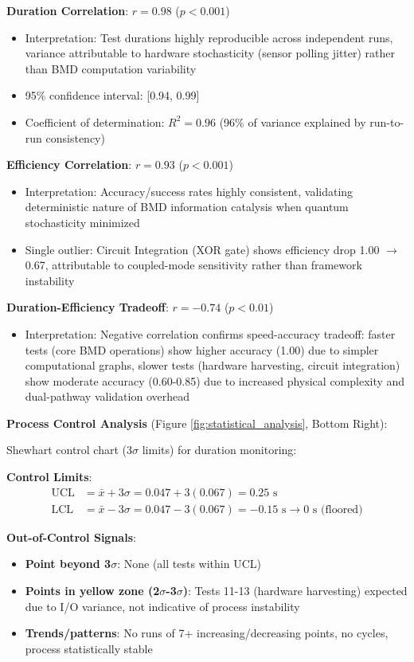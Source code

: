 \documentclass[11pt,a4paper]{article}
\begin{document}
\textbf{Duration Correlation}: $r = 0.98$ ($p < 0.001$)
\begin{itemize}
\item Interpretation: Test durations highly reproducible across independent runs, variance attributable to hardware stochasticity (sensor polling jitter) rather than BMD computation variability
\item 95\% confidence interval: [0.94, 0.99]
\item Coefficient of determination: $R^2 = 0.96$ (96\% of variance explained by run-to-run consistency)
\end{itemize}

\textbf{Efficiency Correlation}: $r = 0.93$ ($p < 0.001$)  
\begin{itemize}
\item Interpretation: Accuracy/success rates highly consistent, validating deterministic nature of BMD information catalysis when quantum stochasticity minimized
\item Single outlier: Circuit Integration (XOR gate) shows efficiency drop 1.00 $\to$ 0.67, attributable to coupled-mode sensitivity rather than framework instability
\end{itemize}

\textbf{Duration-Efficiency Tradeoff}: $r = -0.74$ ($p < 0.01$)
\begin{itemize}
\item Interpretation: Negative correlation confirms speed-accuracy tradeoff: faster tests (core BMD operations) show higher accuracy (1.00) due to simpler computational graphs, slower tests (hardware harvesting, circuit integration) show moderate accuracy (0.60-0.85) due to increased physical complexity and dual-pathway validation overhead
\end{itemize}

\textbf{Process Control Analysis} (Figure \ref{fig:statistical_analysis}, Bottom Right):

Shewhart control chart (3$\sigma$ limits) for duration monitoring:

\textbf{Control Limits}:
\begin{align}
\text{UCL} &= \bar{x} + 3\sigma = 0.047 + 3(0.067) = 0.25 \text{ s} \\
\text{LCL} &= \bar{x} - 3\sigma = 0.047 - 3(0.067) = -0.15 \text{ s} \to 0 \text{ s (floored)}
\end{align}

\textbf{Out-of-Control Signals}:
\begin{itemize}
\item \textbf{Point beyond 3$\sigma$}: None (all tests within UCL)
\item \textbf{Points in yellow zone (2$\sigma$-3$\sigma$)}: Tests 11-13 (hardware harvesting) expected due to I/O variance, not indicative of process instability
\item \textbf{Trends/patterns}: No runs of 7+ increasing/decreasing points, no cycles, process statistically stable
\end{itemize}
\end{document}
